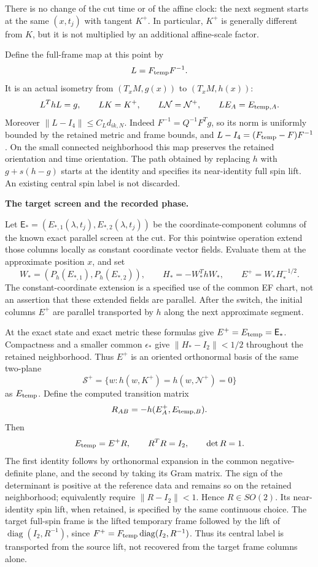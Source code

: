 \documentclass[
  english,
  11pt,
  reqno]{amsart}
\begin{document}
There is no change of the cut time or of the affine clock: the next
segment starts at the same \((x,t_j)\) with tangent \(K^+\). In
particular, \(K^+\) is generally different from \(K\), but it is not
multiplied by an additional affine-scale factor.

Define the full-frame map at this point by \[
 L=F_{\rm temp}F^{-1}.
\] It is an actual isometry from \((T_xM,g(x))\) to \((T_xM,h(x))\): \[
 L^ThL=g,\qquad LK=K^+,\qquad L\mathcal N=\mathcal N^+,\qquad LE_A=E_{{\rm temp},A}.
\] Moreover \(\|L-I_4\|\le C_Ld_{ik,N}\). Indeed \(F^{-1}=Q^{-1}F^Tg\),
so its norm is uniformly bounded by the retained metric and frame
bounds, and \(L-I_4=(F_{\rm temp}-F)F^{-1}\). On the small connected
neighborhood this map preserves the retained orientation and time
orientation. The path obtained by replacing \(h\) with \(g+s(h-g)\)
starts at the identity and specifies its near-identity full spin lift.
An existing central spin label is not discarded.

\textbf{The target screen and the recorded phase.}

Let \(\mathsf E_*=(E_{*,1}(\lambda,t_j),E_{*,2}(\lambda,t_j))\) be the
coordinate-component columns of the known exact parallel screen at the
cut. For this pointwise operation extend those columns locally as
constant coordinate vector fields. Evaluate them at the approximate
position \(x\), and set \[
 W_*=(P_h(E_{*,1}),P_h(E_{*,2})),\qquad
 H_*=-W_*^ThW_*,\qquad
 E^+=W_*H_*^{-1/2}.
\] The constant-coordinate extension is a specified use of the common EF
chart, not an assertion that these extended fields are parallel. After
the switch, the initial columns \(E^+\) are parallel transported by
\(h\) along the next approximate segment.

At the exact state and exact metric these formulas give
\(E^+=E_{\rm temp}=\mathsf E_*\). Compactness and a smaller common
\(\epsilon_*\) give \(\|H_*-I_2\|<1/2\) throughout the retained
neighborhood. Thus \(E^+\) is an oriented orthonormal basis of the same
two-plane \[
 \mathcal S^+=\{w:h(w,K^+)=h(w,\mathcal N^+)=0\}
\] as \(E_{\rm temp}\). Define the computed transition matrix \[
 R_{AB}=-h(E_A^+,E_{{\rm temp},B}).
\] Then \[
 E_{\rm temp}=E^+R,\qquad R^TR=I_2,\qquad \det R=1.
\] The first identity follows by orthonormal expansion in the common
negative-definite plane, and the second by taking its Gram matrix. The
sign of the determinant is positive at the reference data and remains so
on the retained neighborhood; equivalently require \(\|R-I_2\|<1\).
Hence \(R\in SO(2)\). Its near-identity spin lift, when retained, is
specified by the same continuous choice. The target full-spin frame is
the lifted temporary frame followed by the lift of
\(\operatorname{diag}(I_2,R^{-1})\), since
\(F^+=F_{\rm temp}\operatorname{diag}(I_2,R^{-1})\). Thus its central
label is transported from the source lift, not recovered from the target
frame columns alone.
\end{document}
